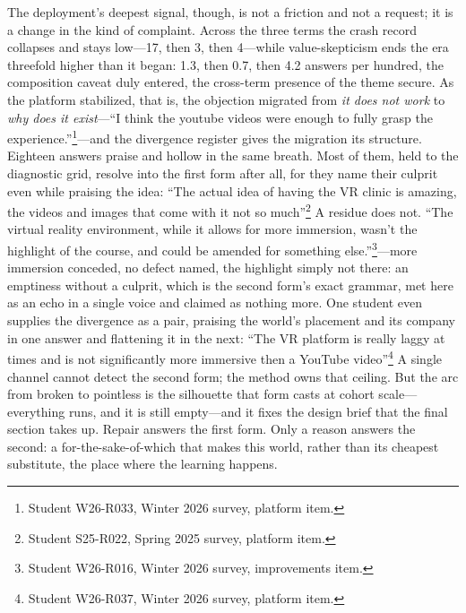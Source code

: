 The deployment's deepest signal, though, is not a friction and not a request; it is a change in the kind of complaint. Across the three terms the crash record collapses and stays low---17, then 3, then 4---while value-skepticism ends the era threefold higher than it began: 1.3, then 0.7, then 4.2 answers per hundred, the composition caveat duly entered, the cross-term presence of the theme secure. As the platform stabilized, that is, the objection migrated from \textit{it does not work} to \textit{why does it exist}---``I think the youtube videos were enough to fully grasp the experience.''\footnote{Student W26-R033, Winter 2026 survey, platform item.}---and the divergence register gives the migration its structure. Eighteen answers praise and hollow in the same breath. Most of them, held to the diagnostic grid, resolve into the first form after all, for they name their culprit even while praising the idea: ``The actual idea of having the VR clinic is amazing, the videos and images that come with it not so much''\footnote{Student S25-R022, Spring 2025 survey, platform item.} A residue does not. ``The virtual reality environment, while it allows for more immersion, wasn't the highlight of the course, and could be amended for something else.''\footnote{Student W26-R016, Winter 2026 survey, improvements item.}---more immersion conceded, no defect named, the highlight simply not there: an emptiness without a culprit, which is the second form's exact grammar, met here as an echo in a single voice and claimed as nothing more. One student even supplies the divergence as a pair, praising the world's placement and its company in one answer and flattening it in the next: ``The VR platform is really laggy at times and is not significantly more immersive then a YouTube video''\footnote{Student W26-R037, Winter 2026 survey, platform item.} A single channel cannot detect the second form; the method owns that ceiling. But the arc from broken to pointless is the silhouette that form casts at cohort scale---everything runs, and it is still empty---and it fixes the design brief that the final section takes up. Repair answers the first form. Only a reason answers the second: a for-the-sake-of-which that makes this world, rather than its cheapest substitute, the place where the learning happens.

